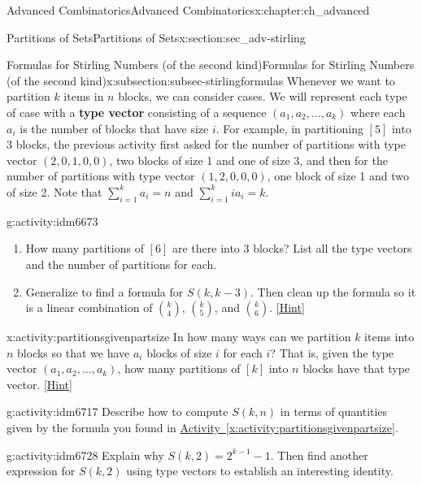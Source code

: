 \documentclass[oneside,10pt,]{book}
\newcommand{\terminology}[1]{\textbf{#1}}
\numberwithin{equation}{chapter}
\begin{document}
\begin{chapterptx}{Advanced Combinatorics}{}{Advanced Combinatorics}{}{}{x:chapter:ch_advanced}
\begin{sectionptx}{Partitions of Sets}{}{Partitions of Sets}{}{}{x:section:sec_adv-stirling}
\begin{subsectionptx}{Formulas for Stirling Numbers (of the second kind)}{}{Formulas for Stirling Numbers (of the second kind)}{}{}{x:subsection:subsec-stirlingformulas}
 Whenever we want to partition \(k\) items in \(n\) blocks, we can consider cases.  We will represent each type of case with a \terminology{type vector} consisting of a sequence \((a_1, a_2, \ldots, a_k)\) where each \(a_i\) is the number of blocks that have size \(i\).  For example, in partitioning \([5]\) into 3 blocks, the previous activity first asked for the number of partitions with type vector \((2,0,1,0,0)\), two blocks of size 1 and one of size 3, and then for the number of partitions with type vector \((1,2,0,0,0)\), one block of size 1 and two of size 2.  Note that \(\sum_{i=1}^k a_i = n\) and \(\sum_{i=1}^k ia_i = k\).%
\begin{activity}{}{g:activity:idm6673}%
\begin{enumerate}[font=\bfseries,label=(\alph*),ref=\alph*]
\item{}How many partitions of \([6]\) are there into 3 blocks?  List all the type vectors and the number of partitions for each.%
\item{}Generalize to find a formula for \(S(k,k-3)\).  Then clean up the formula so it is a linear combination of \(\binom{k}{4}\), \(\binom{k}{5}\), and \(\binom{k}{6}\).%
\space\hspace*{0pt}\hfill{\tiny\hyperlink{g:hint:idm6685-back}{[Hint]}}\end{enumerate}
\end{activity}
\begin{activity}{}{x:activity:partitionsgivenpartsize}%
In how many ways can we partition \(k\) items into \(n\) blocks so that we have \(a_i\) blocks of size \(i\) for each \(i\)? That is, given the type vector \((a_1, a_2, \ldots, a_k)\), how many partitions of \([k]\) into \(n\) blocks have that type vector.%
\space\hspace*{0pt}\hfill{\tiny\hyperlink{g:hint:idm6699-back}{[Hint]}}\end{activity}
\begin{activity}{}{g:activity:idm6717}%
Describe how to compute \(S(k,n)\) in terms of quantities given by the formula you found in \hyperref[x:activity:partitionsgivenpartsize]{Activity~\ref{x:activity:partitionsgivenpartsize}}.%
\end{activity}
\begin{activity}{}{g:activity:idm6728}%
Explain why \(S(k, 2) = 2^{k-1} - 1\).  Then find another expression for \(S(k,2)\) using type vectors to establish an interesting identity.%
\end{activity}

\end{subsectionptx}
\end{sectionptx}
\end{chapterptx}
\end{document}
